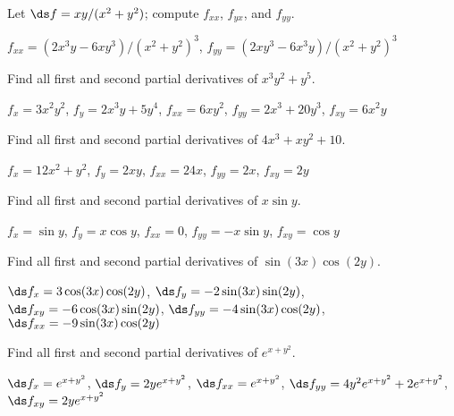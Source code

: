\begin{exercises}

\begin{exercise} Let $\ds f=xy/(x^2+y^2)$; compute $f_{xx}$, $f_{yx}$, and $f_{yy}$.
\begin{answer} $f_{xx}=(2x^3y-6xy^3)/(x^2+y^2)^3$,
$f_{yy}=(2xy^3-6x^3y)/(x^2+y^2)^3$
\end{answer}\end{exercise}

\begin{exercise} Find all first and second partial derivatives of
$x^3y^2+y^5$.
\begin{answer} $f_x=3x^2y^2$, $f_y=2x^3y+5y^4$, 
$f_{xx}=6xy^2$, $f_{yy}=2x^3+20y^3$, $f_{xy}=6x^2y$
\end{answer}\end{exercise}

\begin{exercise} Find all first and second partial derivatives of
$4x^3+xy^2+10$.
\begin{answer} $f_x=12x^2+y^2$, $f_y=2xy$, \hfill\break 
$f_{xx}=24x$, $f_{yy}=2x$, $f_{xy}=2y$
\end{answer}\end{exercise}

\begin{exercise} Find all first and second partial derivatives of
$x\sin y$.
\begin{answer} $f_x=\sin y$, $f_y=x\cos y$, $f_{xx}=0$, $f_{yy}=-x\sin y$,
$f_{xy}=\cos y$
\end{answer}\end{exercise}

\begin{exercise} Find all first and second partial derivatives of
$\sin(3x)\cos(2y)$.
\begin{answer} $\ds f_x=3\cos(3x)\cos(2y)$,\hfill\break 
$\ds f_y=-2\sin(3x)\sin(2y)$,\hfill\break 
$\ds f_{xy}=-6\cos(3x)\sin(2y)$,\hfill\break 
$\ds f_{yy}=-4\sin(3x)\cos(2y)$,\hfill\break 
$\ds f_{xx}=-9\sin(3x)\cos(2y)$
\end{answer}\end{exercise}

\begin{exercise} Find all first and second partial derivatives of
$e^{x+y^2}$.
\begin{answer} $\ds f_x=e^{x+y^2}$, $\ds f_y=2ye^{x+y^2}$,\hfill\break 
$\ds f_{xx}=e^{x+y^2}$,\hfill\break 
$\ds f_{yy}=4y^2e^{x+y^2}+2e^{x+y^2}$,\hfill\break 
$\ds f_{xy}=2ye^{x+y^2}$
\end{answer}\end{exercise}


\end{exercises}
